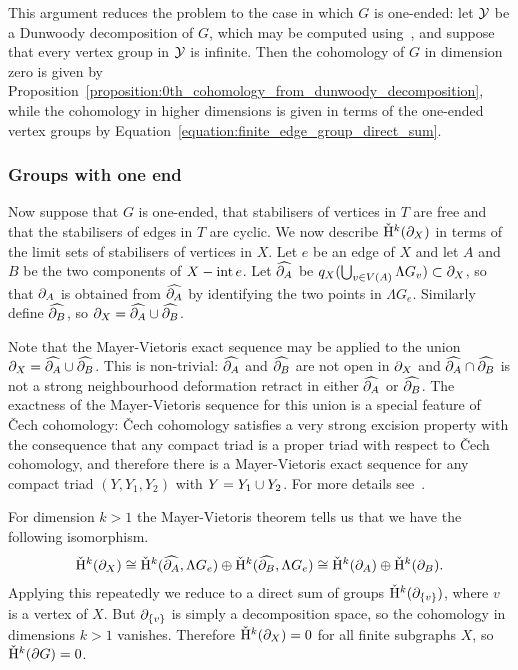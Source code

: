 This argument reduces the problem to the case in which $G$ is one-ended: let $\mathcal{Y}$ be a Dunwoody decomposition of $G$, which may be computed using~\cite{dahmanigroves08a}, and suppose that every vertex group in $\mathcal{Y}$ is infinite.
Then the cohomology of $G$ in dimension zero is given by Proposition~\ref{proposition:0th_cohomology_from_dunwoody_decomposition}, while the cohomology in higher dimensions is given in terms of the one-ended vertex groups by Equation~\ref{equation:finite_edge_group_direct_sum}.

\subsubsection{Groups with one end}

Now suppose that $G$ is one-ended, that stabilisers of vertices in $T$ are free and that the stabilisers of edges in $T$ are cyclic.
We now describe $\check{\mathrm{H}}{}^k(\partial_X)$ in terms of the limit sets of stabilisers of vertices in $X$.
Let $e$ be an edge of $X$ and let $A$ and $B$ be the two components of $X - \operatorname{int} e$.
Let $\widehat{\partial_A}$ be $q_X(\bigcup_{v \in V(A)} \Lambda G_v) \subset \partial_X$, so that $\partial_A$ is obtained from $\widehat{\partial_A}$ by identifying the two points in $\Lambda G_e$.
Similarly define $\widehat{\partial_B}$, so $\partial_X = \widehat{\partial_A} \cup \widehat{\partial_B}$.

Note that the Mayer-Vietoris exact sequence may be applied to the union $\partial_X = \widehat{\partial_A} \cup \widehat{\partial_B}$.
This is non-trivial: $\widehat{\partial_A}$ and $\widehat{\partial_B}$ are not open in $\partial_X$ and $\widehat{\partial_A} \cap \widehat{\partial_B}$ is not a strong neighbourhood deformation retract in either $\widehat{\partial_A}$ or $\widehat{\partial_B}$.
The exactness of the Mayer-Vietoris sequence for this union is a special feature of \v{C}ech cohomology: \v{C}ech cohomology satisfies a very strong excision property with the consequence that any compact triad is a proper triad with respect to \v{C}ech cohomology, and therefore there is a Mayer-Vietoris exact sequence for any compact triad $(Y, Y_1, Y_2)$ with $Y = Y_1 \cup Y_2$.
For more details see~\cite[Chapter 10]{eilenbergsteenrod52}.

For dimension $k > 1$ the Mayer-Vietoris theorem tells us that we have the following isomorphism.
\begin{align}
  \check{\mathrm{H}}{}^k(\partial_X) \cong \check{\mathrm{H}}{}^k(\widehat{\partial_A}, \Lambda G_e) \oplus \check{\mathrm{H}}{}^k(\widehat{\partial_B}, \Lambda G_e) \cong \check{\mathrm{H}}{}^k(\partial_A) \oplus \check{\mathrm{H}}{}^k(\partial_B).
\end{align}
Applying this repeatedly we reduce to a direct sum of groups $\check{\mathrm{H}}{}^k(\partial_{\{v\}})$, where $v$ is a vertex of $X$.
But $\partial_{\{v\}}$ is simply a decomposition space, so the cohomology in dimensions $k > 1$ vanishes.
Therefore $\check{\mathrm{H}}{}^k(\partial_X) = 0$ for all finite subgraphs $X$, so $\check{\mathrm{H}}{}^k(\partial G) = 0$.

